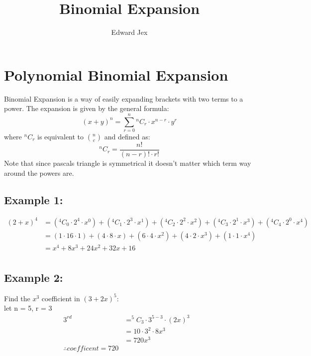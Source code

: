 \documentclass[a4paper,12pt,fleqn]{article}
\begin{document}
\title{Binomial Expansion}	
\author{Edward Jex}
\maketitle
\section*{Polynomial Binomial Expansion}
Binomial Expansion is a way of easily expanding brackets with two terms to a power. The expansion is given by the general formula: 
\begin{equation*}
(x + y)^n = \sum^{n}_{r=0} ^nC_r \cdot x^{n-r} \cdot y^r
\end{equation*} 
where $^nC_r$ is equivalent to $\binom{n}{c}$ and defined as:
\begin{equation*}
^nC_r = \frac{n!}{(n-r)! \cdot r!}
\end{equation*}
Note that since pascals triangle is symmetrical it doesn't matter which term way around the powers are.

\subsection*{Example 1:}
\begin{align*}
(2 + x)^4  & =
  (^4C_0 \cdot 2^4 \cdot x^0) 
+ (^4C_1 \cdot 2^3 \cdot x^1) 
+ (^4C_2 \cdot 2^2 \cdot x^2) 
+ (^4C_3 \cdot 2^1 \cdot x^3) 
+ (^4C_4 \cdot 2^0 \cdot x^4)&\\
& =
  (1 \cdot 16 \cdot 1) 
+ (4 \cdot 8 \cdot x) 
+ (6 \cdot 4 \cdot x^2) 
+ (4 \cdot 2 \cdot x^3)
+ (1 \cdot 1 \cdot x^4)&\\
& = x^4 + 8x^3 + 24x^2 + 32x + 16&\\
\end{align*}

\subsection*{Example 2:}
Find the $x^3$ coefficient in $(3 + 2x)^5$:
\\
let n = 5, r = 3
\begin{align*}
3^{rd}\; & = ^5C_3 \cdot 3^{5-3} \cdot (2x)^3 &\\
 & = 10 \cdot 3^2 \cdot 8x^3 &\\
 & = 720x^3 &\\
\therefore coefficent = 720
\end{align*}
\end{document}
